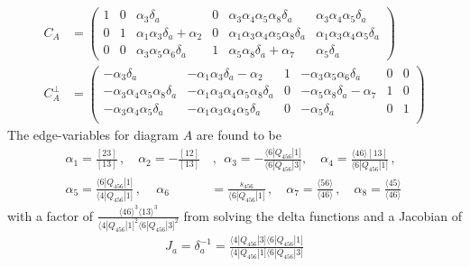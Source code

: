 \documentclass[letter,11pt]{article}
\newcommand{\ab}[1]{\langle #1 \rangle}
\newcommand{\sqb}[1]{[ #1 ]}
\newcommand{\aMs}[3]{\langle #1|#2|#3]}  		%
\newcommand{\sab}[1]{s_{#1}}
\begin{document}
\begin{equation}
	\begin{aligned}
		C_A&=\left(
		\begin{array}{cccccc}
			1 & 0 & \alpha _3 \delta_a & 0 & \alpha _3 \alpha _4 \alpha _5 \alpha _8 \delta_a & \alpha _3 \alpha _4 \alpha _5 \delta_a \\
			0 & 1 & \alpha _1 \alpha _3 \delta_a+\alpha _2 & 0 & \alpha _1 \alpha _3 \alpha _4 \alpha _5 \alpha _8 \delta_a & \alpha _1 \alpha _3 \alpha _4 \alpha _5 \delta_a \\
			0 & 0 & \alpha _3 \alpha _5 \alpha _6 \delta_a & 1 & \alpha _5 \alpha _8 \delta_a+\alpha _7 & \alpha _5 \delta_a
		\end{array}
		\right)\\
		C_A^{\perp}&=\left(
		\begin{array}{cccccc}
			-\alpha _3 \delta_a & -\alpha _1 \alpha _3 \delta_a-\alpha _2 & 1 & -\alpha _3 \alpha _5 \alpha _6 \delta_a & 0 & 0 \\
			-\alpha _3 \alpha _4 \alpha _5 \alpha _8 \delta_a & -\alpha _1 \alpha _3 \alpha _4 \alpha _5 \alpha _8 \delta_a & 0 & -\alpha _5 \alpha _8 \delta_a-\alpha _7 & 1 & 0 \\
			-\alpha _3 \alpha _4 \alpha _5 \delta_a & -\alpha _1 \alpha _3 \alpha _4 \alpha _5 \delta_a & 0 & -\alpha _5 \delta_a & 0 & 1 \\
		\end{array}
		\right)
	\end{aligned}
\end{equation}
The edge-variables for diagram $A$ are found to be
\begin{align*}
 \alpha_1 = \frac{[23]}{[13]}\,, \quad \alpha_2 =- \frac{[12]}{[13]}&\,,~~
	\alpha_3 = - \frac{\aMs{6}{Q_{456}}{1}}{\aMs{6}{Q_{456}}{3}}, \quad
	\alpha_4 = \frac{\ab{46}\sqb{13}}{\aMs{6}{Q_{456}}{1}}\,,\\
	 \alpha_5 = \frac{\aMs{6}{Q_{456}}{1}}{\aMs{4}{Q_{456}}{1}}\,,\quad
	 \,\alpha_6 &= \frac{\sab{456}}{\aMs{6}{Q_{456}}{1}}\,, \quad \alpha_7 = \frac{\ab{56}}{\ab{46}}\,, \quad
	\alpha_8 = \frac{\ab{45}}{\ab{46}}\,  
\end{align*}
with a factor of $\frac{\ab{46}^3\ab{13}^3}{\aMs{4}{Q_{456}}{1}^2\aMs{6}{Q_{456}}{3}^2}$ from solving the delta functions and a Jacobian of
\begin{equation}
	\begin{aligned}
		J_a=\delta_a^{-1}=\frac{\aMs{4}{Q_{456}}{3}\aMs{6}{Q_{456}}{1}}{\aMs{4}{Q_{456}}{1}\aMs{6}{Q_{456}}{3}}
	\end{aligned}
\end{equation}
\end{document}
